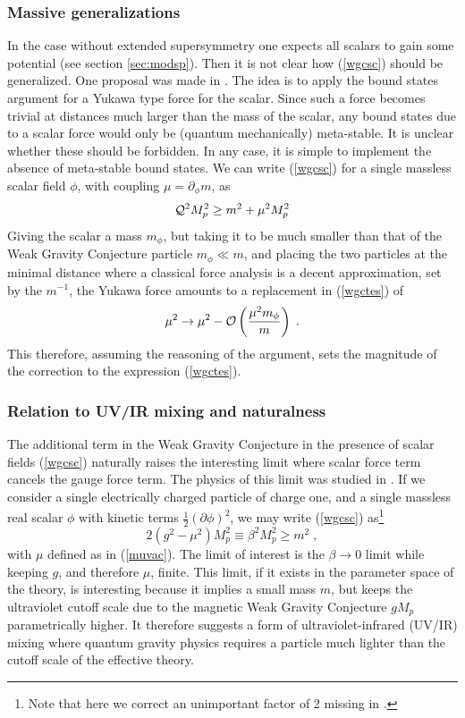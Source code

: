 \documentclass[11pt,a4paper]{article}
\numberwithin{equation}{section}
\numberwithin{table}{section}\setlength{\multlinegap}{25pt}
\newcommand{\be}{\begin{equation}}
\newcommand{\ee}{\end{equation}}
\begin{document}
\subsubsection*{Massive generalizations}

In the case without extended supersymmetry one expects all scalars to gain some potential (see section \ref{sec:modsp}). Then it is not clear how (\ref{wgcsc}) should be generalized. One proposal was made in \cite{Lust:2017wrl}. The idea is to apply the bound states argument for a Yukawa type force for the scalar. Since such a force becomes trivial at distances much larger than the mass of the scalar, any bound states due to a scalar force would only be (quantum mechanically) meta-stable. It is unclear whether these should be forbidden. In any case, it is simple to implement the absence of meta-stable bound states. We can write (\ref{wgcsc}) for a single massless scalar field $\phi$, with coupling $\mu = \partial_{\phi} m$, as
\be
\label{wgctes}
{\cal Q}^2 M_p^2 \geq m^2 + \mu^2 M_p^2
\ee
Giving the scalar a mass $m_{\phi}$, but taking it to be much smaller than that of the Weak Gravity Conjecture particle $m_{\phi} \ll m$, and placing the two particles at the minimal distance where a classical force analysis is a decent approximation, set by the $m^{-1}$, the Yukawa force amounts to a replacement in (\ref{wgctes}) of
\be
\mu^2 \rightarrow \mu^2 - {\cal O} \left(\frac{\mu^2 m_{\phi}}{m} \right) \;.
\ee
This therefore, assuming the reasoning of the argument, sets the magnitude of the correction to the expression (\ref{wgctes}).

\subsubsection*{Relation to UV/IR mixing and naturalness}

The additional term in the Weak Gravity Conjecture in the presence of scalar fields (\ref{wgcsc}) naturally raises the interesting limit where scalar force term cancels the gauge force term. The physics of this limit was studied in \cite{Lust:2017wrl}. If we consider a single electrically charged particle of charge one, and a single massless real scalar $\phi$ with kinetic terms $\frac12 \left(\partial \phi \right)^2$, we may write (\ref{wgcsc}) as\footnote{Note that here we correct an unimportant factor of 2 missing in \cite{Lust:2017wrl}.}
\be
2\left( g^2 - \mu^2 \right) M_p^2 \equiv \beta^2 M_p^2 \geq m^2 \;,
\label{simineq}
\ee
with $\mu$ defined as in (\ref{muvac}). The limit of interest is the $\beta \rightarrow 0$ limit while keeping $g$, and therefore $\mu$, finite. This limit, if it exists in the parameter space of the theory, is interesting because it implies a small mass $m$, but keeps the ultraviolet cutoff scale due to the magnetic Weak Gravity Conjecture $g M_p$ parametrically higher. It therefore suggests a form of ultraviolet-infrared (UV/IR) mixing where quantum gravity physics requires a particle much lighter than the cutoff scale of the effective theory. 
\end{document}
